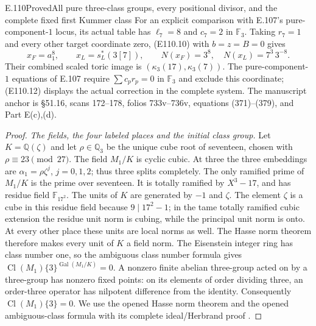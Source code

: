 \begin{statement}{E.110}{Proved}{All pure three-class groups, every positional divisor, and the complete fixed first Kummer class}
For an explicit comparison with E.107's pure-component-$1$ locus,
its actual table has $\ell_7=8$ and $c_7=2$ in $\mathbb F_3$.
Taking $r_7=1$ and every other target coordinate zero, (E110.10)
with $b=z=B=0$ gives
\[
 x_F=a_1^8,\qquad x_L=s_L^*(3[7]),\qquad
 N(x_F)=3^8,\quad N(x_L)=7^3\,3^{-8}.
 \tag{E110.12}
\]
Their combined scaled toric image is
$(\kappa_3(17),\kappa_3(7))$.
The pure-component-$1$ equations of E.107 require
$\sum c_pr_p=0$ in $\mathbb F_3$ and exclude this coordinate;
(E110.12) displays the actual correction in the complete system.
The manuscript anchor is \S51.16, scans 172--178,
folios 733v--736v, equations (371)--(379), and Part E(c),(d).
\end{statement}

\begin{proof}
\emph{The fields, the four labeled places and the initial class group.}
Let $K=\mathbb Q(\zeta)$ and let $\rho\in\mathbb Q_3$ be the
unique cube root of seventeen, chosen with
$\rho\equiv23\pmod{27}$.
The field $M_1/K$ is cyclic cubic. At three the three embeddings
are $\alpha_1=\rho\zeta^j$, $j=0,1,2$; thus three splits completely.
The only ramified prime of $M_1/K$ is the prime over seventeen.
It is totally ramified by $X^3-17$, and has residue field
$\mathbb F_{17^2}$.
The units of $K$ are generated by $-1$ and $\zeta$.
The element $\zeta$ is a cube in this residue field because
$9\mid17^2-1$; in the tame totally ramified cubic extension the
residue unit norm is cubing, while the principal unit norm is onto.
At every other place these units are local norms as well.
The Hasse norm theorem therefore makes every unit of $K$ a field
norm. The Eisenstein integer ring has class number one, so the
ambiguous class number formula gives
$\operatorname{Cl}(M_1)\{3\}^{\operatorname{Gal}(M_1/K)}=0$.
A nonzero finite abelian three-group acted on by a three-group
has nonzero fixed points: on its elements of order dividing three,
an order-three operator has nilpotent difference from the identity.
Consequently $\operatorname{Cl}(M_1)\{3\}=0$.
We use the opened Hasse norm theorem
\cite[VIII, Theorem 3.1 and its proof]{E_MilneCFT}
and the opened ambiguous-class formula with its complete
ideal/Herbrand proof
\cite[Theorem 1, formulas (1),(2), and Proposition 1]{E_LemmermeyerAmbiguous}.


\end{proof}
